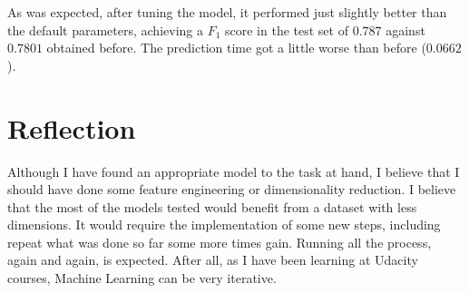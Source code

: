 \documentclass[a4paper]{article}
\begin{document}
As was expected, after tuning the model, it performed just slightly better than the default parameters, achieving a $F_1$ score in the test set of $0.787$ against $0.7801$ obtained before. The prediction time got a little worse than before ($0.0662$).


\section{Reflection}
Although I have found an appropriate model to the task at hand, I believe that I should have done some feature engineering or dimensionality reduction. I believe that the most of the models tested would benefit from a dataset with less dimensions. It would require the implementation of some new steps, including repeat what was done so far some more times gain. Running all the process, again and again, is expected. After all, as I have been learning at Udacity courses, Machine Learning can be very iterative.






\end{document}
